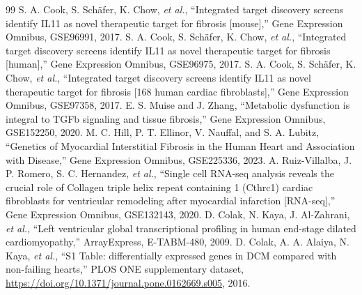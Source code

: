 \documentclass[preprint,11pt]{elsarticle}
\begin{document}
\begin{thebibliography}{99}
 S. A. Cook, S. Sch\"afer, K. Chow, \emph{et al.}, ``Integrated target discovery screens identify IL11 as novel therapeutic target for fibrosis [mouse],'' Gene Expression Omnibus, GSE96991, 2017.
 S. A. Cook, S. Sch\"afer, K. Chow, \emph{et al.}, ``Integrated target discovery screens identify IL11 as novel therapeutic target for fibrosis [human],'' Gene Expression Omnibus, GSE96975, 2017.
 S. A. Cook, S. Sch\"afer, K. Chow, \emph{et al.}, ``Integrated target discovery screens identify IL11 as novel therapeutic target for fibrosis [168 human cardiac fibroblasts],'' Gene Expression Omnibus, GSE97358, 2017.
 E. S. Muise and J. Zhang, ``Metabolic dysfunction is integral to TGFb signaling and tissue fibrosis,'' Gene Expression Omnibus, GSE152250, 2020.
 M. C. Hill, P. T. Ellinor, V. Nauffal, and S. A. Lubitz, ``Genetics of Myocardial Interstitial Fibrosis in the Human Heart and Association with Disease,'' Gene Expression Omnibus, GSE225336, 2023.
 A. Ruiz-Villalba, J. P. Romero, S. C. Hernandez, \emph{et al.}, ``Single cell RNA-seq analysis reveals the crucial role of Collagen triple helix repeat containing 1 (Cthrc1) cardiac fibroblasts for ventricular remodeling after myocardial infarction [RNA-seq],'' Gene Expression Omnibus, GSE132143, 2020.
 D. Colak, N. Kaya, J. Al-Zahrani, \emph{et al.}, ``Left ventricular global transcriptional profiling in human end-stage dilated cardiomyopathy,'' ArrayExpress, E-TABM-480, 2009.
 D. Colak, A. A. Alaiya, N. Kaya, \emph{et al.}, ``S1 Table: differentially expressed genes in DCM compared with non-failing hearts,'' PLOS ONE supplementary dataset, \href{https://doi.org/10.1371/journal.pone.0162669.s005}{https://doi.org/10.1371/journal.pone.0162669.s005}, 2016.
\end{thebibliography}
\end{document}
